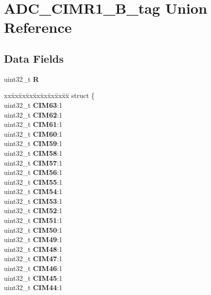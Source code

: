 \hypertarget{unionADC__CIMR1__32B__tag}{}\section{A\+D\+C\+\_\+\+C\+I\+M\+R1\+\_\+B\+\_\+tag Union Reference}
\label{unionADC__CIMR1__32B__tag}
\subsection*{Data Fields}
\begin{DoxyCompactItemize}
\item 
\mbox{\label{unionADC__CIMR1__32B__tag_ae01b3cf9e73bc0c5680ea349cdfb313f}} 
uint32\+\_\+t {\bfseries R}
\item 
\mbox{\label{unionADC__CIMR1__32B__tag_a8aa37f917248dae86e64997ce8c36c61}} 
\begin{tabbing}
xx\=xx\=xx\=xx\=xx\=xx\=xx\=xx\=xx\=\kill
struct \{\\
\>uint32\_t {\bfseries CIM63}:1\\
\>uint32\_t {\bfseries CIM62}:1\\
\>uint32\_t {\bfseries CIM61}:1\\
\>uint32\_t {\bfseries CIM60}:1\\
\>uint32\_t {\bfseries CIM59}:1\\
\>uint32\_t {\bfseries CIM58}:1\\
\>uint32\_t {\bfseries CIM57}:1\\
\>uint32\_t {\bfseries CIM56}:1\\
\>uint32\_t {\bfseries CIM55}:1\\
\>uint32\_t {\bfseries CIM54}:1\\
\>uint32\_t {\bfseries CIM53}:1\\
\>uint32\_t {\bfseries CIM52}:1\\
\>uint32\_t {\bfseries CIM51}:1\\
\>uint32\_t {\bfseries CIM50}:1\\
\>uint32\_t {\bfseries CIM49}:1\\
\>uint32\_t {\bfseries CIM48}:1\\
\>uint32\_t {\bfseries CIM47}:1\\
\>uint32\_t {\bfseries CIM46}:1\\
\>uint32\_t {\bfseries CIM45}:1\\
\>uint32\_t {\bfseries CIM44}:1\\

\end{tabbing}
\end{DoxyCompactItemize}
